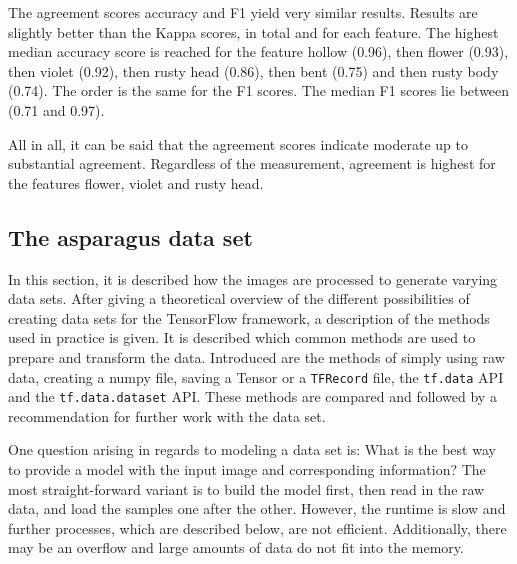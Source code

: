 The agreement scores accuracy and F1 yield very similar results. Results are slightly better than the Kappa scores, in total and for each feature. The highest median accuracy score is reached for the feature hollow (0.96), then flower (0.93), then violet (0.92), then rusty head (0.86), then bent (0.75) and then rusty body (0.74). The order is the same for the F1 scores. The median F1 scores lie between (0.71 and 0.97).

\bigskip
All in all, it can be said that the agreement scores indicate moderate up to substantial agreement. Regardless of the measurement, agreement is highest for the features flower, violet and rusty head.


\subsection{The asparagus data set}
\label{sec:AsparagusDataSet}

In this section, it is described how the images are processed to generate varying data sets. After giving a theoretical overview of the different possibilities of creating data sets for the TensorFlow framework, a description of the methods used in practice is given. It is described which common methods are used to prepare and transform the data. Introduced are the methods of simply using raw data, creating a numpy file, saving a Tensor or a \texttt{TFRecord} file, the \texttt{tf.data} API and the \texttt{tf.data.dataset} API. These methods are compared and followed by a recommendation for further work with the data set.

One question arising in regards to modeling a data set is: What is the best way to provide a model with the input image and corresponding information? The most straight-forward variant is to build the model first, then read in the raw data, and load the samples one after the other. However, the runtime is slow and further processes, which are described below, are not efficient. Additionally, there may be an overflow and large amounts of data do not fit into the memory.

